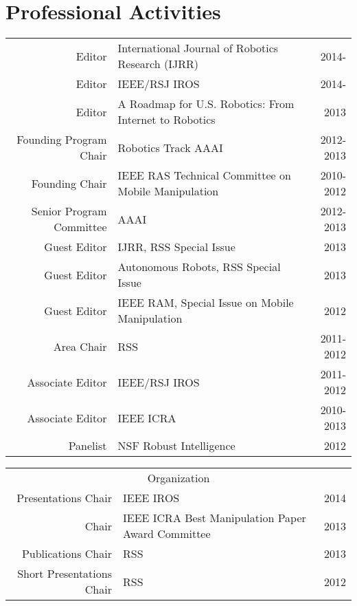 \documentclass[10pt]{article}
\begin{document}
\section{Professional Activities}
\begin{tabularx}{\linewidth}{rXr}
Editor & International Journal of Robotics Research (IJRR) & 2014-\\
Editor & IEEE/RSJ IROS &  2014-\\
Editor & A Roadmap for U.S. Robotics: From Internet to Robotics & 2013\\
Founding Program Chair & Robotics Track AAAI & 2012-2013 \\
Founding Chair & IEEE RAS Technical Committee on Mobile Manipulation & 2010-2012\\
Senior Program Committee & AAAI & 2012-2013 \\
Guest Editor & IJRR, RSS Special Issue & 2013\\ 
Guest Editor & Autonomous Robots, RSS Special Issue & 2013\\ 
Guest Editor & IEEE RAM, Special Issue on Mobile Manipulation & 2012\\
Area Chair & RSS & 2011-2012\\
Associate Editor & IEEE/RSJ IROS & 2011-2012\\
Associate Editor & IEEE ICRA & 2010-2013\\
Panelist & NSF Robust Intelligence & 2012\\
\end{tabularx}

\begin{tabularx}{\linewidth}{rXr}
\multicolumn{3}{c}{Organization}\\
Presentations Chair & IEEE IROS & 2014\\ 
Chair & IEEE ICRA Best Manipulation Paper Award Committee & 2013\\
Publications Chair & RSS & 2013\\
Short Presentations Chair & RSS & 2012\\
\end{tabularx}
\end{document}
